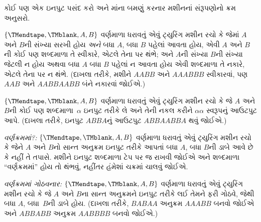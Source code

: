 \documentclass[../../../include/open-logic-section]{subfiles}
\begin{document}
\begin{prob}
કોઈ પણ એક ઇનપુટ પસંદ કરો અને માંના
બમણું કરનાર મશીનનાં સંરૂપણોનો ક્રમ અનુસરો.
\end{prob}

\begin{prob}
$\{\TMendtape,\TMblank, A, B\}$ વર્ણમાળા ધરાવતું એવું
ટ્યુરિંગ મશીન રચો કે જેમાં $A$ અને $B$ની સંખ્યા સરખી
હોય \emph{અને} બધા $A$, બધા $B$ પહેલાં આવતા હોય,
એવી $A$ અને $B$ની કોઈ પણ શબ્દમાળા તે સ્વીકારે,
એટલે તેના પર થંભે; અને $A$ની સંખ્યા $B$ની સંખ્યા
જેટલી ન હોય અથવા બધા $A$ બધા $B$ પહેલાં ન આવતા
હોય એવી શબ્દમાળા તે નકારે, એટલે તેના પર ન થંભે.
(દાખલા તરીકે, મશીને $AABB$ અને $AAABBB$ સ્વીકારવાં,
પણ $AAB$ અને $AABBAABB$ બંને નકારવાં જોઈએ.)
\end{prob}

\begin{prob}
$\{\TMendtape,\TMblank, A, B\}$ વર્ણમાળા ધરાવતું એવું
ટ્યુરિંગ મશીન રચો કે જે $A$ અને $B$ની કોઈ પણ
શબ્દમાળા~$\alpha$ ઇનપુટ તરીકે લે અને તેની નકલ કરીને
$\alpha\alpha$ સ્વરૂપનું આઉટપુટ આપે. (દાખલા તરીકે,
ઇનપુટ $ABBA$નું આઉટપુટ $ABBAABBA$ થવું જોઈએ.)
\end{prob}

\begin{prob}
\emph{વર્ણક્રમમાં?:} $\{\TMendtape,\TMblank, A, B\}$ વર્ણમાળા
ધરાવતું એવું ટ્યુરિંગ મશીન રચો કે જેને $A$ અને $B$નો
સાન્ત અનુક્રમ ઇનપુટ તરીકે આપતાં બધા $A$, બધા $B$ની
ડાબે આવે છે કે નહીં તે તપાસે. મશીને ઇનપુટ શબ્દમાળા ટેપ
પર જ રાખવી જોઈએ અને શબ્દમાળા ``વર્ણક્રમમાં'' હોય તો
થંભવું, નહીંતર હંમેશાં ચક્રમાં ચાલવું જોઈએ.
\end{prob}

\begin{prob}
\emph{વર્ણક્રમમાં ગોઠવનાર:} $\{\TMendtape,\TMblank, A, B\}$
વર્ણમાળા ધરાવતું એવું ટ્યુરિંગ મશીન રચો કે જે $A$ અને
$B$ના સાન્ત અનુક્રમને ઇનપુટ તરીકે લઈ તેમને ફરી ગોઠવે,
જેથી બધા $A$, બધા~$B$ની ડાબે હોય. (દાખલા તરીકે,
$BABAA$ અનુક્રમ $AAABB$ બનવો જોઈએ અને $ABBABB$
અનુક્રમ $AABBBB$ બનવો જોઈએ.)
\end{prob}
\end{document}
